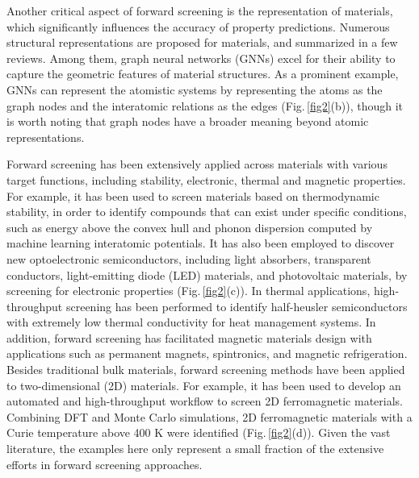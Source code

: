 \documentclass[fleqn,10pt]{wlscirep}
\begin{document}
Another critical aspect of forward screening is the representation of materials, which significantly influences the accuracy of property predictions. Numerous structural representations are proposed for materials, and summarized in a few reviews\cite{musil2021physics,reiser2022graph}.
Among them, graph neural networks (GNNs) excel for their ability to capture the geometric features of material structures. As a prominent example, GNNs can represent the atomistic systems by representing the atoms as the graph nodes and the interatomic relations as the edges\cite{xie2018crystal} (Fig.\,\ref{fig2}(b)), though it is worth noting that graph nodes have a broader meaning beyond atomic representations\cite{Okabe2024VGNN}. 

Forward screening has been extensively applied across materials with various target functions, including stability, electronic, thermal and magnetic properties. For example, it has been used to screen materials based on thermodynamic stability, in order to identify compounds that can exist under specific conditions, such as energy above the convex hull and phonon dispersion computed by machine learning interatomic potentials\cite{batatia2023foundation}.
It has also been employed to discover new optoelectronic semiconductors, including light absorbers, transparent conductors, light-emitting diode (LED) materials, and photovoltaic materials, by screening for electronic properties\cite{luo2021high} (Fig.\,\ref{fig2}(c)). 
In thermal applications, high-throughput screening has been performed to identify half-heusler semiconductors with extremely low thermal conductivity for heat management systems\cite{carrete2014finding}. In addition, forward screening has facilitated magnetic materials design with applications such as permanent magnets, spintronics, and magnetic refrigeration\cite{zhang2021high}. Besides traditional bulk materials, forward screening methods have been applied to two-dimensional (2D) materials. For example, it has been used to develop an automated and high-throughput workflow to screen 2D ferromagnetic materials. Combining DFT and Monte Carlo simulations, 2D ferromagnetic materials with a Curie temperature above 400 K were identified \cite{kabiraj2020high} (Fig.\,\ref{fig2}(d)). Given the vast literature, the examples here only represent a small fraction of the extensive efforts in forward screening approaches.
\end{document}
